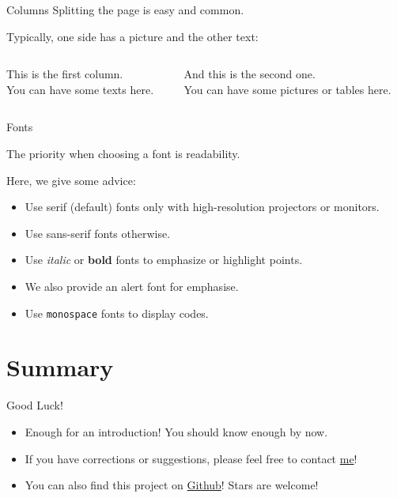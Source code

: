 \documentclass[10pt,aspectratio=169]{beamer}
\begin{document}
\begin{frame}{Columns}
	Splitting the page is easy and common.

	Typically, one side has a picture and the other text:
	
	\vspace{20pt}
	
	\begin{columns}
		\begin{column}{0.6\textwidth}
			This is the first column.\\[10pt]
			You can have some texts here.
		\end{column}
		
		\begin{column}{0.3\textwidth}
			And this is the second one.\\[10pt]
			You can have some pictures or tables here.
		\end{column}
	\end{columns}

\end{frame}

\begin{frame}{Fonts}
	
	The priority when choosing a font is readability.
	
	Here, we give some advice:
	\begin{itemize}
		\item Use serif (default) fonts only with high-resolution projectors or monitors.
		\item Use \textsf{sans-serif} fonts otherwise.
		\item Use \textit{italic} or \textbf{bold} fonts to emphasize or highlight points.
		\item We also provide an \alert{alert} font for emphasise.
		\item Use \texttt{monospace} fonts to display codes.
	\end{itemize}

\end{frame}

\section{Summary}

\begin{frame}{Good Luck!}
	\begin{itemize}
		\item Enough for an introduction! You should know enough by now.
		\item If you have corrections or suggestions, please feel free to contact \href{mailto:yuu_seeing@foxmail.com}{me}!
        \item You can also find this project on \href{https://github.com/ID-VerNe/HKU_Beamer_Slides}{Github}! Stars are welcome!
	\end{itemize}
\end{frame}

\backmatter %
\end{document}
